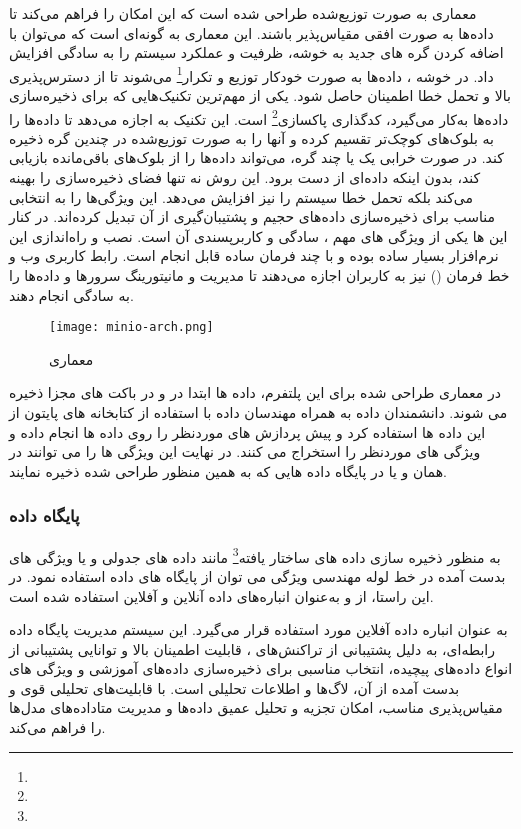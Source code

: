 معماری  به صورت توزیع‌شده طراحی شده است که این امکان را فراهم می‌کند تا داده‌ها به صورت افقی مقیاس‌پذیر باشند. این معماری به گونه‌ای است که می‌توان با اضافه کردن گره های جدید به خوشه، ظرفیت و عملکرد سیستم را به سادگی افزایش داد. در خوشه ، داده‌ها به صورت خودکار توزیع و تکرار\footnote{} می‌شوند تا از دسترس‌پذیری بالا و تحمل خطا اطمینان حاصل شود. یکی از مهم‌ترین تکنیک‌هایی که  برای ذخیره‌سازی داده‌ها به‌کار می‌گیرد، کدگذاری پاکسازی\footnote{} است. این تکنیک به  اجازه می‌دهد تا داده‌ها را به بلوک‌های کوچک‌تر تقسیم کرده و آنها را به صورت توزیع‌شده در چندین گره ذخیره کند. در صورت خرابی یک یا چند گره،  می‌تواند داده‌ها را از بلوک‌های باقی‌مانده بازیابی کند، بدون اینکه داده‌ای از دست برود. این روش نه تنها فضای ذخیره‌سازی را بهینه می‌کند بلکه تحمل خطا سیستم را نیز افزایش می‌دهد. این ویژگی‌ها  را به انتخابی مناسب برای ذخیره‌سازی داده‌های حجیم و پشتیبان‌گیری از آن تبدیل کرده‌اند. در کنار این ها یکی از ویژگی های مهم ، سادگی و کاربرپسندی آن است. نصب و راه‌اندازی این نرم‌افزار بسیار ساده بوده و با چند فرمان ساده قابل انجام است. رابط کاربری وب و خط فرمان () نیز به کاربران اجازه می‌دهند تا مدیریت و مانیتورینگ سرورها و داده‌ها را به سادگی انجام دهند.

\begin{figure}[t]
	\centering
	\texttt{[image: minio-arch.png]}
	\caption{معماری }
	\label{fig: minio arch}
\end{figure}

در معماری طراحی شده برای این پلتفرم، داده ها ابتدا در  و در باکت های مجزا ذخیره می شوند. دانشمندان داده به همراه مهندسان داده با استفاده از کتابخانه های پایتون از این داده ها استفاده کرد و پیش پردازش های موردنظر را روی داده ها انجام داده و ویژگی های موردنظر را استخراج می کنند. در نهایت این ویژگی ها را می توانند در همان  و یا در پایگاه داده هایی که به همین منظور طراحی شده ذخیره نمایند.

\subsubsection{پایگاه داده}
به منظور ذخیره سازی داده های ساختار یافته\footnote{} مانند داده های جدولی و یا ویژگی های بدست آمده در خط لوله مهندسی ویژگی می توان از پایگاه های داده استفاده نمود. در این راستا، از  و  به‌عنوان انباره‌های داده آنلاین و آفلاین استفاده شده است.

به عنوان انباره داده آفلاین مورد استفاده قرار می‌گیرد. این سیستم مدیریت پایگاه داده رابطه‌ای، به دلیل پشتیبانی از تراکنش‌های ، قابلیت اطمینان بالا و توانایی پشتیبانی از انواع داده‌های پیچیده، انتخاب مناسبی برای ذخیره‌سازی داده‌های آموزشی و ویژگی های بدست آمده از آن، لاگ‌ها و اطلاعات تحلیلی است.  با قابلیت‌های تحلیلی قوی و مقیاس‌پذیری مناسب، امکان تجزیه و تحلیل عمیق داده‌ها و مدیریت متاداده‌های مدل‌ها را فراهم می‌کند.

